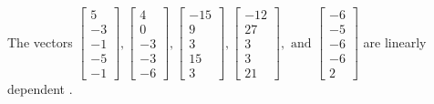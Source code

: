 \begin{exercise}
\begin{exerciseStatement}
  \end{exerciseStatement}
  \begin{exerciseAnswer}
   The vectors \(\left[\begin{array}{r}
5 \\
-3 \\
-1 \\
-5 \\
-1
\end{array}\right] , \left[\begin{array}{r}
4 \\
0 \\
-3 \\
-3 \\
-6
\end{array}\right] , \left[\begin{array}{r}
-15 \\
9 \\
3 \\
15 \\
3
\end{array}\right] , \left[\begin{array}{r}
-12 \\
27 \\
3 \\
3 \\
21
\end{array}\right] , \text{ and } \left[\begin{array}{r}
-6 \\
-5 \\
-6 \\
-6 \\
2
\end{array}\right]\) are 
  	 linearly dependent  .
  


  \end{exerciseAnswer}
\end{exercise}